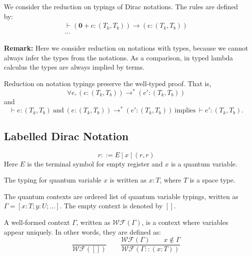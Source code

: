 \begin{definition}
  We consider the reduction on typings of Dirac notations. The rules are defined by:
  \begin{gather*}
    \vdash (\mathbf{0} + e : (T_k, T_b)) \to (e : (T_k, T_b))\\
    \cdots
  \end{gather*}  
\end{definition}

\textbf{Remark:} Here we consider reduction on notations with types, because we cannot always infer the types from the notations. As a comparison, in typed lambda calculus the types are always implied by terms.

\begin{claim}
  Reduction on notation typings preserve the well-typed proof. That is,
  $$
  \forall e, (e : (T_k, T_b)) \to^* (e' : (T_k, T_b))
  $$
  and
  $$
  \vdash e : (T_k, T_b)\ \mathrm{and}\ (e : (T_k, T_b)) \to^* (e' : (T_k, T_b))\ \mathrm{implies}\ \vdash e' : (T_k, T_b).
  $$
\end{claim}

\subsection{Labelled Dirac Notation}

\begin{definition}
  $$
  r ::= E\ |\ x\ |\ (r, r)
  $$
  Here $E$ is the terminal symbol for empty register and $x$ is a quantum variable.
\end{definition}

\begin{definition}
  The typing for quantum variable $x$ is written as $x : T$, where $T$ is a space type.
\end{definition}

\begin{definition}
  The quantum contexts are ordered list of quantum variable typings, written as $\Gamma = [x : T; y : U; \dots]$. The empty context is denoted by $[]$.
\end{definition}

\begin{definition}
  A well-formed context $\Gamma$, written as $\mathcal{WF}(\Gamma)$, is a context where variables appear uniquely. In other words, they are defined as:
  $$
  \frac{}{\mathcal{WF}([])}
  \qquad
  \frac{\mathcal{WF}(\Gamma)\qquad x \notin \Gamma}{\mathcal{WF}(\Gamma :: (x : T))}
  $$
\end{definition}



